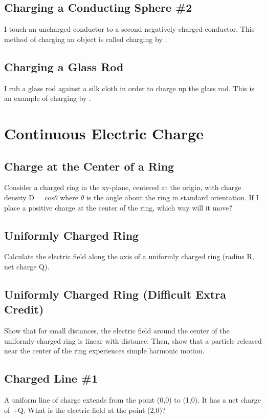 \documentclass[11pt]{article}
\begin{document}
\subsection{Charging a Conducting Sphere \#2}
I touch an uncharged conductor to a second negatively charged conductor.  This method of charging an object is called charging by \underline{\hspace{1cm}}.

\subsection{Charging a Glass Rod}
I rub a glass rod against a silk cloth in order to charge up the glass rod.  This is an example of charging by \underline{\hspace{1cm}}.



\pagebreak
\section{Continuous Electric Charge}

\subsection{Charge at the Center of a Ring}
Consider a charged ring in the xy-plane, centered at the origin, with charge density D = cos$\theta$ where $\theta$ is the angle about the ring in standard orientation.  If I place a positive charge at the center of the ring, which way will it move?

\subsection{Uniformly Charged Ring}
Calculate the electric field along the axis of a uniformly charged ring (radius R, net charge Q).

\subsection{Uniformly Charged Ring (Difficult Extra Credit)}
Show that for small distances, the electric field around the center of the uniformly charged ring is linear with distance.  Then, show that a particle released near the center of the ring experiences simple harmonic motion.

\subsection{Charged Line \#1}
A uniform line of charge extends from the point (0,0) to (1,0).  It has a net charge of +Q.  What is the electric field at the point (2,0)?
\end{document}
